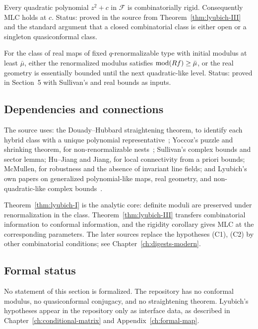 \begin{corollary}
\label{cor:lyubich-rigidity}
Every quadratic polynomial $z^2+c$ in $\mathcal F$ is combinatorially rigid.
Consequently MLC holds at $c$.  Status: proved in the source from
Theorem~\ref{thm:lyubich-III} and the standard argument that a closed
combinatorial class is either open or a singleton quasiconformal class.
\end{corollary}

\begin{theorem}
\label{thm:lyubich-D}
For the class of real maps of fixed $q$-renormalizable type with initial modulus
at least $\bar\mu$, either the renormalized modulus satisfies
$\operatorname{mod}(Rf)\ge\bar\mu$, or the real geometry is essentially bounded until the
next quadratic-like level.  Status: proved in Section~5 with Sullivan's and real
bounds as inputs.
\end{theorem}

\subsection*{Dependencies and connections}

The source uses:
the Douady--Hubbard straightening theorem, to identify each hybrid class with a unique
polynomial representative~\cite{DHPolynomialLike};
Yoccoz's puzzle and shrinking theorem, for non-renormalizable nests~\cite{HubbardYoccoz};
Sullivan's complex bounds and sector lemma;
Hu--Jiang and Jiang, for local connectivity from a priori bounds;
McMullen, for robustness and the absence of invariant line fields;
and Lyubich's own papers on generalized polynomial-like maps, real geometry, and
non-quadratic-like complex bounds~\cite{LyubichDynamics}.

Theorem~\ref{thm:lyubich-I} is the analytic core: definite moduli are preserved
under renormalization in the class.  Theorem~\ref{thm:lyubich-III} transfers
combinatorial information to conformal information, and the rigidity corollary
gives MLC at the corresponding parameters.  The later sources replace the
hypotheses (C1), (C2) by other combinatorial conditions; see
Chapter~\ref{ch:digests-modern}.

\subsection*{Formal status}

No statement of this section is formalized.  The repository has no conformal
modulus, no quasiconformal conjugacy, and no straightening theorem.  Lyubich's
hypotheses appear in the repository only as interface data, as described in
Chapter~\ref{ch:conditional-matrix} and Appendix~\ref{ch:formal-map}.
